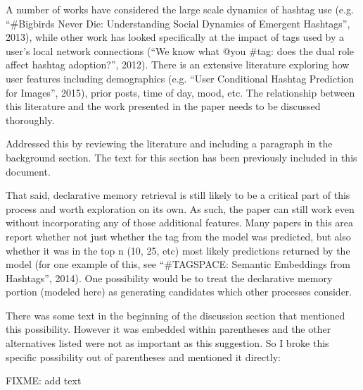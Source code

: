 \documentclass[answers,12pt]{exam}
\begin{document}
\begin{questions}
\question A number of works have considered the large scale dynamics of hashtag use (e.g. ``\#Bigbirds Never Die: Understanding Social Dynamics of Emergent Hashtags'', 2013), while other work has looked specifically at the impact of tags used by a user's local network connections (``We know what @you \#tag: does the dual role affect hashtag adoption?'', 2012). There is an extensive literature exploring how user features including demographics (e.g. ``User Conditional Hashtag Prediction for Images'', 2015), prior posts, time of day, mood, etc. The relationship between this literature and the work presented in the paper needs to be discussed thoroughly.

\begin{solution}
Addressed this by reviewing the literature and including a paragraph in the background section.
The text for this section has been previously included in this document.
\end{solution}

\question That said, declarative memory retrieval is still likely to be a critical part of this process and worth exploration on its own. As such, the paper can still work even without incorporating any of those additional features. Many papers in this area report whether not just whether the tag from the model was predicted, but also whether it was in the top n (10, 25, etc) most likely predictions returned by the model (for one example of this, see ``\#TAGSPACE: Semantic Embeddings from Hashtags'', 2014). One possibility would be to treat the declarative memory portion (modeled here) as generating candidates which other processes consider.

\begin{solution}

There was some text in the beginning of the discussion section that mentioned this possibility.
However it was embedded within parentheses and the other alternatives listed were not as important as this suggestion.
So I broke this specific possibility out of parentheses and mentioned it directly:

FIXME: add text

\end{solution}

\end{questions}
\end{document}
